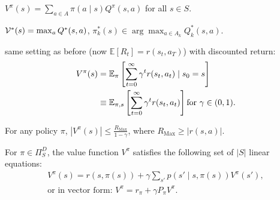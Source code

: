 \begin{clm}
$V^\pi(s) = \sum_{a \in A} \pi(a \mid s) Q^\pi(s, a)$ for all $s \in S$.
\end{clm}

\begin{clm}$\mathcal{V}^*(s) = \max_a Q^*(s, a)$, $\pi_k^*(s) \in \arg \max_{a \in A_k} Q_k^*(s, a)$.
\end{clm}

\begin{deff}
 same setting as before (now $\mathbb{E}[R_t] = r(s_t, a_T)$) with discounted return:
\begin{align*}
V^\pi(s) &= \mathbb{E}_\pi \left[ \sum_{t=0}^\infty \gamma^t r(s_t, a_t) \mid s_0 = s \right] \\ &\equiv \mathbb{E}_{\pi, s} \left[ \sum_{t=0}^\infty \gamma^t r(s_t, a_t) \right]\text{for $ \gamma \in (0, 1)$.}
\end{align*}
\end{deff}


\begin{clm}
For any policy $\pi$, $|V^\pi(s)| \leq \frac{R_{\text{Max}}}{1 - \gamma}$, where $R_{\text{Max}} \geq |r(s, a)|$.
\end{clm}

\begin{lem}
For $\pi \in \Pi_S^D$, the value function $V^\pi$ satisfies the following set of $|S|$ linear equations:
\begin{align*}
V^\pi(s) = r(s, \pi(s)) + \gamma \sum_{s'} p(s' \mid s, \pi(s)) V^\pi(s'), \\ \text{or in vector form: } V^\pi = r_\pi + \gamma P_\pi V^\pi.
\end{align*}

\end{lem}

